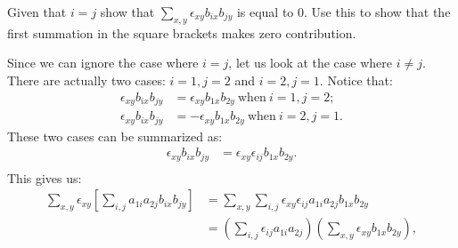 \begin{exercise}{}
Given that $i=j$ show that $\sum_{x,y} \epsilon_{xy}  b_{ix}b_{jy}$  is equal to 0. Use this to show that the first summation in the square brackets makes zero contribution.
\end{exercise}
Since we can ignore the case where $i=j$, let us look at the case where $i \neq j$.  There are actually two cases: $i=1, j=2$ and $i=2, j=1$.  Notice that:
\begin{align*}
 \epsilon_{xy} b_{ix}b_{jy}&=\epsilon_{xy} b_{1x}b_{2y}~\text{when}~i=1,j=2;\\
 \epsilon_{xy} b_{ix}b_{jy}&= -\epsilon_{xy} b_{1x}b_{2y}~\text{when}~i=2,j=1.
\end{align*}
These two cases can be summarized as:
\begin{align*}
 \epsilon_{xy} b_{ix}b_{jy}&=\epsilon_{xy}\epsilon_{ij} b_{1x}b_{2y}.\\
\end{align*}
This gives us:
\begin{align*}
\sum_{x,y} \epsilon_{xy} \left[ \sum_{i,j}  a_{1i}a_{2j} b_{ix}b_{jy}\right]&= \sum_{x,y}  \sum_{i,j} \epsilon_{xy}\epsilon_{ij}   a_{1i}a_{2j} b_{1x}b_{2y}\\
&=  \left(\sum_{i,j}\epsilon_{ij}   a_{1i}a_{2j}\right)\left(\sum_{x,y}  \epsilon_{xy} b_{1x}b_{2y}\right),
\end{align*}
